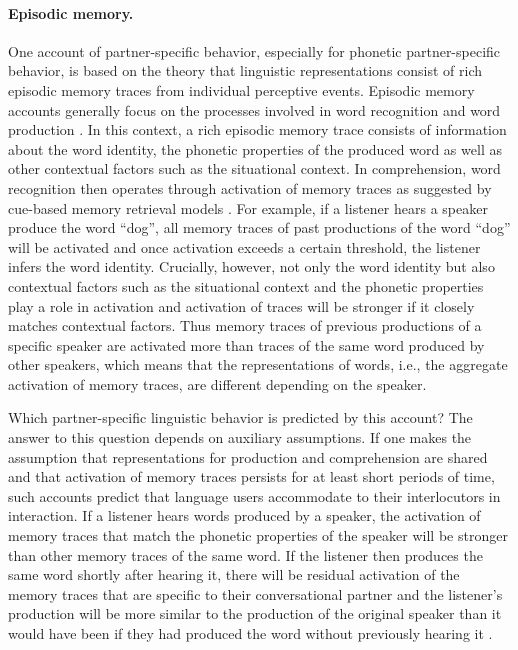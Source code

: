\paragraph{Episodic memory.} One account of partner-specific behavior, especially for phonetic partner-specific behavior, is based
on the theory that linguistic representations consist of rich episodic memory traces from individual perceptive events. Episodic memory
accounts generally focus on the processes involved in word recognition and word production .
In this context, a rich episodic memory trace consists of information about the word identity, the phonetic properties of the produced word as well as other contextual factors
such as the situational context. In comprehension, word recognition then operates through
activation of memory traces as suggested by cue-based memory retrieval models . For example, if a listener hears a speaker produce 
the word ``dog'', all memory traces of past productions of the word
``dog'' will be activated and once activation exceeds a certain threshold, the listener infers the word identity. Crucially, however, not only the word identity
but also contextual factors such as the situational context and the phonetic properties play a role in activation and activation of traces will be stronger if it closely matches
contextual factors. Thus memory traces of previous productions of a specific speaker are activated more than traces of the same word produced by other speakers,
which means that the representations of words, i.e., the aggregate activation of memory traces, are different depending on the speaker.

Which partner-specific linguistic behavior is predicted by this account? The answer to this question depends on auxiliary assumptions.
If one makes the assumption that representations for production and comprehension are shared and that activation of memory traces persists for at least
short periods of time, such accounts predict that language users
accommodate to their interlocutors in interaction. If a listener hears words produced by a speaker, the activation of memory traces that match the phonetic properties of the speaker
will be stronger than other memory traces of the same word. If the listener then produces the same word shortly after hearing it, there will be residual activation of the memory 
traces that are specific to their conversational partner and the listener's production will be more similar to the production of the original speaker than it would have been if they had
produced the word without previously hearing it \cite{Goldinger1998}.

